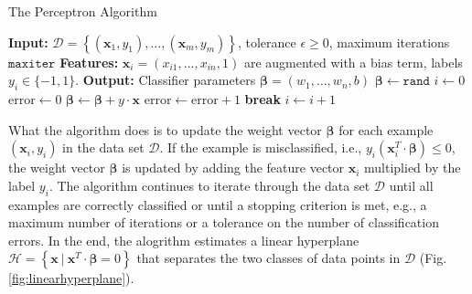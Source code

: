 \documentclass{article}[11pt]
\begin{document}
\begin{algorithm}[H]
    \caption{The Perceptron Algorithm}\label{alg:perceptron}
    \begin{algorithmic}[1]
        \State \textbf{Input:} $\mathcal{D} = \left\{(\mathbf{x}_{1},y_{1}),\dotsc,(\mathbf{x}_{m},y_{m})\right\}$, tolerance $\epsilon\geq{0}$, maximum iterations $\texttt{maxiter}$
        \State \textbf{Features:} $\mathbf{x}_{i} = \left(x_{i1},\dots, x_{in},1\right)$ are augmented with a bias term, labels $y_{i}\in\{-1,1\}$.
        \State \textbf{Output:} Classifier parameters $\mathbf{\beta} = \left(w_{1},\dots, w_{n}, b\right)$
        \State $\mathbf{\beta} \gets \texttt{rand}$
        \State $i \gets 0$
        \State $\text{error} \gets 0$
                \State $\mathbf{\beta} \gets \mathbf{\beta} + {y}\cdot\mathbf{x}$
                \State $\text{error} \gets \text{error} + 1$
            \EndIf
        \EndFor
            \State \textbf{break}     
        \EndIf
        \State $i \gets i + 1$
        \EndWhile
    \end{algorithmic}
\end{algorithm}
What the algorithm does is to update the weight vector $\mathbf{\beta}$ for each example $(\mathbf{x}_{i},y_{i})$ in the data set $\mathcal{D}$.
If the example is misclassified, i.e., $y_{i}\left(\mathbf{x}_{i}^{T}\cdot\mathbf{\beta}\right)\leq{0}$, the weight vector $\mathbf{\beta}$ is updated by adding the feature vector $\mathbf{x}_{i}$ multiplied by the label $y_{i}$.
The algorithm continues to iterate through the data set $\mathcal{D}$ until all examples are correctly classified or until a stopping criterion is met, e.g., a maximum number of iterations or a tolerance on the number of classification errors.
In the end, the alogrithm estimates a linear hyperplane $\mathcal{H} = \left\{\mathbf{x}~|~\mathbf{x}^{T}\cdot\mathbf{\beta} = 0\right\}$ that separates the two classes of data points in $\mathcal{D}$ (Fig. \ref{fig:linearhyperplane}).
\end{document}
